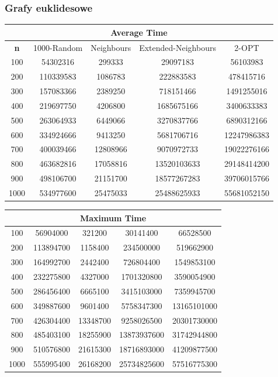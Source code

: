 \documentclass{article}
\begin{document}
\subsubsection{Grafy euklidesowe}

\begin{center}
\begin{tabular}{|c|c|c|c|c|}
\hline
\multicolumn{5}{|c|}{\textbf{Average Time}}\\
\hline
\textbf{n} & 1000-Random & Neighbours & Extended-Neighbours & 2-OPT\\
\hline
100 & 54302316 & 299333 & 29097183 & 56103983\\
\hline
200 & 110339583 & 1086783 & 222883583 & 478415716\\
\hline
300 & 157083366 & 2389250 & 718151466 & 1491255016\\
\hline
400 & 219697750 & 4206800 & 1685675166 & 3400633383\\
\hline
500 & 263064933 & 6449066 & 3270837766 & 6890312166\\
\hline
600 & 334924666 & 9413250 & 5681706716 & 12247986383\\
\hline
700 & 400039466 & 12808966 & 9070972733 & 19022276166\\
\hline
800 & 463682816 & 17058816 & 13520103633 & 29148414200\\
\hline
900 & 498106700 & 21151700 & 18577267283 & 39706015766\\
\hline
1000 & 534977600 & 25475033 & 25488625933 & 55681052150\\
\hline
\end{tabular}
\end{center}


\begin{center}
\begin{tabular}{|c|c|c|c|c|}
\hline
\multicolumn{5}{|c|}{\textbf{Maximum Time}}\\
\hline
100 & 56904000 & 321200 & 30141400 & 66528500\\
\hline
200 & 113894700 & 1158400 & 234500000 & 519662900\\
\hline
300 & 164992700 & 2442400 & 726804400 & 1549853100\\
\hline
400 & 232275800 & 4327000 & 1701320800 & 3590054900\\
\hline
500 & 286456400 & 6665100 & 3415103000 & 7359945700\\
\hline
600 & 349887600 & 9601400 & 5758347300 & 13165101000\\
\hline
700 & 426304400 & 13348700 & 9258026500 & 20301730000\\
\hline
800 & 485403100 & 18255900 & 13873937600 & 31742944800\\
\hline
900 & 510576800 & 21615300 & 18716893000 & 41209877500\\
\hline
1000 & 555995400 & 26168200 & 25734825600 & 57516775300\\
\hline
\end{tabular}
\end{center}
\end{document}
